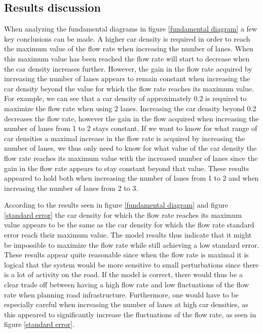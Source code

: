 \documentclass[a4paper,12pt]{article}
\begin{document}
\subsection*{Results discussion}
When analyzing the fundamental diagrams in figure \ref*{fundamental diagram} a few key conclusions can be made.
A higher car density is required in order to reach the maximum value of the flow rate when increasing the number of lanes.
When this maximum value has been reached the flow rate will start to decrease when the car density increases further.
However, the gain in the flow rate acquired by increasing the number of lanes appears to remain constant when increasing
the car density beyond the value for which the flow rate reaches its maximum value. For example, we can see that
a car density of approximately 0.2 is required to maximize the flow rate when using 2 lanes. Increasing the car density
beyond 0.2 decreases the flow rate, however the gain in the flow acquired when increasing the number of lanes from 1 to 2 
stays constant. If we want to know for what range of car densities a maximal increase in the flow rate is acquired by increasing
the number of lanes, we thus only need to know for what value of the car density the flow rate reaches its maximum value with the increased
number of lanes since the gain in the flow rate appears to stay constant beyond that value. These results appeared to hold
both when increasing the number of lanes from 1 to 2 and when increasing the number of lanes from 2 to 3.

According to the results seen in figure \ref*{fundamental diagram} and figure \ref*{standard error} the car density for which the flow rate reaches its maximum value appears
to be the same as the car density for which the flow rate standard error reach their maximum value. The model results thus indicate that it might be impossible to maximize the flow rate while still
achieving a low standard error. These results appear quite reasonable since when the flow rate is maximal it is logical that the system would be more sensitive
to small perturbations since there is a lot of activity on the road. If the model is correct, there would thus be a clear trade off between having a high flow rate and
low fluctuations of the flow rate when planning road infrastructure. 
Furthermore, one would have to be especially careful when increasing the number of lanes at high car densities, 
as this appeared to significantly increase the fluctuations of the flow rate, as seen in figure \ref*{standard error}.
\end{document}
